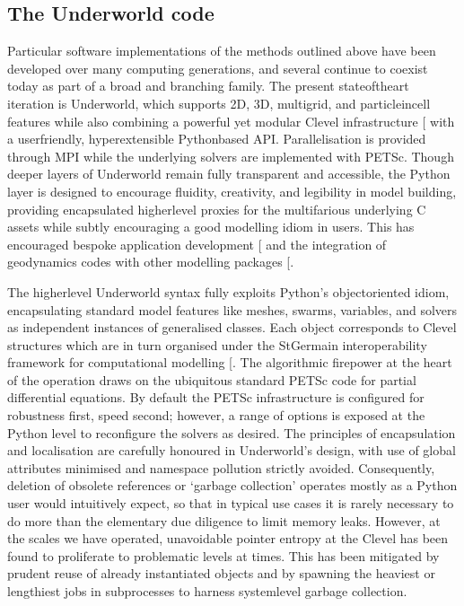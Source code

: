 \documentclass[letterpaper,10pt,english]{jupyterBook}
\begin{document}
\subsection{The Underworld code}
\label{\detokenize{content/chapter_02_methods/section2:the-underworld-code}}
\sphinxAtStartPar
Particular software implementations of the methods outlined above have been developed over many computing generations, and several continue to co\sphinxhyphen{}exist today as part of a broad and branching family. The present state\sphinxhyphen{}of\sphinxhyphen{}the\sphinxhyphen{}art iteration is Underworld, which supports 2D, 3D, multigrid, and particle\sphinxhyphen{}in\sphinxhyphen{}cell features while also combining a powerful yet modular C\sphinxhyphen{}level infrastructure {[}\sphinxcite{references:id70}{]} with a user\sphinxhyphen{}friendly, hyper\sphinxhyphen{}extensible Python\sphinxhyphen{}based API. Parallelisation is provided through MPI while the underlying solvers are implemented with PETSc. Though deeper layers of Underworld remain fully transparent and accessible, the Python layer is designed to encourage fluidity, creativity, and legibility in model building, providing encapsulated higher\sphinxhyphen{}level proxies for the multifarious underlying C assets while subtly encouraging a good modelling idiom in users. This has encouraged bespoke application development {[}\sphinxcite{references:id71}{]} and the integration of geodynamics codes with other modelling packages {[}\sphinxcite{references:id66}{]}.

\sphinxAtStartPar
The higher\sphinxhyphen{}level Underworld syntax fully exploits Python’s object\sphinxhyphen{}oriented idiom, encapsulating standard model features like meshes, swarms, variables, and solvers as independent instances of generalised classes. Each object corresponds to C\sphinxhyphen{}level structures which are in turn organised under the StGermain interoperability framework for computational modelling {[}\sphinxcite{references:id70}{]}. The algorithmic firepower at the heart of the operation draws on the ubiquitous standard PETSc code for partial differential equations. By default the PETSc infrastructure is configured for robustness first, speed second; however, a range of options is exposed at the Python level to reconfigure the solvers as desired. The principles of encapsulation and localisation are carefully honoured in Underworld’s design, with use of global attributes minimised and namespace pollution strictly avoided. Consequently, deletion of obsolete references or ‘garbage collection’ operates mostly as a Python user would intuitively expect, so that in typical use cases it is rarely necessary to do more than the elementary due diligence to limit memory leaks. However, at the scales we have operated, unavoidable pointer entropy at the C\sphinxhyphen{}level has been found to proliferate to problematic levels at times. This has been mitigated by prudent reuse of already instantiated objects and by spawning the heaviest or lengthiest jobs in subprocesses to harness system\sphinxhyphen{}level garbage collection.
\end{document}
